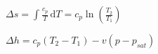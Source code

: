 \( \Delta s = \int \frac{c_p}{T} \, \text{d}T = c_p \ln \left( \frac{T_2}{T_1} \right) \)  

\( \Delta h = c_p \left( T_2 - T_1 \right) - v \left( p - p_{sat} \right) \)